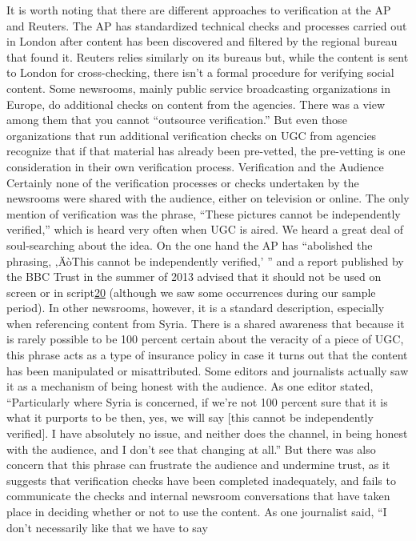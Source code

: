 \documentclass[symmetric, notoc, nobib]{towcenter-book}
\begin{document}
It is worth noting that there are different approaches to verification at the
AP and Reuters. The AP has standardized technical checks and processes
carried out in London after content has been discovered and filtered by the
regional bureau that found it. Reuters relies similarly on its bureaus but,
while the content is sent to London for cross-checking, there isn't a formal
procedure for verifying social content.
Some newsrooms, mainly public service broadcasting organizations in
Europe, do additional checks on content from the agencies. There was a
view among them that you cannot ``outsource verification.'' But even those
organizations that run additional verification checks on UGC from agencies
recognize that if that material has already been pre-vetted, the pre-vetting is
one consideration in their own verification process.
Verification and the Audience
Certainly none of the verification processes or checks undertaken by the
newsrooms were shared with the audience, either on television or online.
The only mention of verification was the phrase, ``These pictures cannot be
independently verified,'' which is heard very often when UGC is aired. We
heard a great deal of soul-searching about the idea.
On the one hand the AP has ``abolished the phrasing, ‚ÄòThis cannot be independently
verified,' '' and a report published by the BBC Trust in the summer
of 2013 advised that it should not be used on screen or in script{\href{#endnotes}{20}} (although
we saw some occurrences during our sample period). In other newsrooms,
however, it is a standard description, especially when referencing content
from Syria.
There is a shared awareness that because it is rarely possible to be 100 percent
certain about the veracity of a piece of UGC, this phrase acts as a type
of insurance policy in case it turns out that the content has been manipulated
or misattributed. Some editors and journalists actually saw it as a
mechanism of being honest with the audience. As one editor stated, ``Particularly where Syria is concerned, if we're not 100 percent sure that it is
what it purports to be then, yes, we will say [this cannot be independently
verified]. I have absolutely no issue, and neither does the channel, in being
honest with the audience, and I don't see that changing at all.''
But there was also concern that this phrase can frustrate the audience and
undermine trust, as it suggests that verification checks have been completed
inadequately, and fails to communicate the checks and internal newsroom
conversations that have taken place in deciding whether or not to use the
content. As one journalist said, ``I don't necessarily like that we have to say
\end{document}
